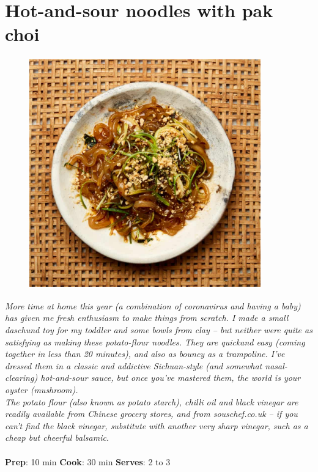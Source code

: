 \documentclass{book}
\begin{document}
\section{Hot-and-sour noodles with pak choi}
\begin{figure}
\centering\includegraphics[width=10cm,height=10cm,keepaspectratio]{Recipe_Pictures/Hot-and-sour_noodles_with_pak_choi.png}
\end{figure}
\emph{More time at home this year (a combination of coronavirus and having a baby) has given me fresh enthusiasm to make things from scratch. I made a small daschund toy for my toddler and some bowls from clay – but neither were quite as satisfying as making these potato-flour noodles. They are quickand easy (coming together in less than 20 minutes), and also as bouncy as a trampoline. I’ve dressed them in a classic and addictive Sichuan-style (and somewhat nasal-clearing) hot-and-sour sauce, but once you’ve mastered them, the world is your oyster (mushroom).\\ 
The potato flour (also known as potato starch), chilli oil and black vinegar are readily available from Chinese grocery stores, and from souschef.co.uk – if you can’t find the black vinegar, substitute with another very sharp vinegar, such as a cheap but cheerful balsamic.}\\\\ 
\textbf{Prep}: 10 min
\textbf{Cook}: 30 min
\textbf{Serves}: 2 to 3
\end{document}
